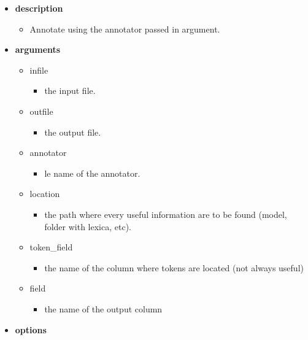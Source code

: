 \documentclass[manual-fr.tex]{subfiles}
\begin{document}
\begin{itemize}
    \item[] \textbf{description}
        \begin{itemize}
            \item[] Annotate using the annotator passed in argument.
        \end{itemize}
    \item[] \textbf{arguments}
        \begin{itemize}
            \item[] infile
                \begin{itemize}
                    \item[] the input file.
                \end{itemize}
            \item[] outfile
                \begin{itemize}
                    \item[] the output file.
                \end{itemize}
            \item[] annotator
                \begin{itemize}
                    \item[] le name of the annotator.
                \end{itemize}
            \item[] location
                \begin{itemize}
                    \item[] the path where every useful information are to be found (model, folder with lexica, etc).
                \end{itemize}
            \item[] token\_field
                \begin{itemize}
                    \item[] the name of the column where tokens are located (not always useful)
                \end{itemize}
            \item[] field
                \begin{itemize}
                    \item[] the name of the output column
                \end{itemize}
        \end{itemize}
    \item[] \textbf{options}
        \begin{itemize}

\end{itemize}
\end{itemize}
\end{document}

